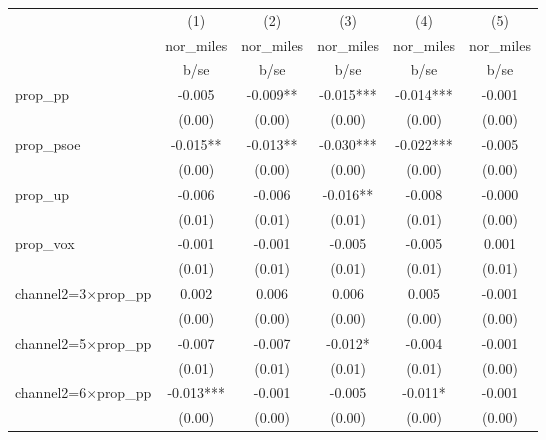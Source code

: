 \begin{tabular}{l*{5}{c}}
\toprule
                    &\multicolumn{1}{c}{(1)}&\multicolumn{1}{c}{(2)}&\multicolumn{1}{c}{(3)}&\multicolumn{1}{c}{(4)}&\multicolumn{1}{c}{(5)}\\
                    &\multicolumn{1}{c}{nor\_miles}&\multicolumn{1}{c}{nor\_miles}&\multicolumn{1}{c}{nor\_miles}&\multicolumn{1}{c}{nor\_miles}&\multicolumn{1}{c}{nor\_miles}\\
                    &        b/se   &        b/se   &        b/se   &        b/se   &        b/se   \\
\midrule
prop\_pp             &      -0.005   &      -0.009** &      -0.015***&      -0.014***&      -0.001   \\
                    &      (0.00)   &      (0.00)   &      (0.00)   &      (0.00)   &      (0.00)   \\
prop\_psoe           &      -0.015** &      -0.013** &      -0.030***&      -0.022***&      -0.005   \\
                    &      (0.00)   &      (0.00)   &      (0.00)   &      (0.00)   &      (0.00)   \\
prop\_up             &      -0.006   &      -0.006   &      -0.016** &      -0.008   &      -0.000   \\
                    &      (0.01)   &      (0.01)   &      (0.01)   &      (0.01)   &      (0.00)   \\
prop\_vox            &      -0.001   &      -0.001   &      -0.005   &      -0.005   &       0.001   \\
                    &      (0.01)   &      (0.01)   &      (0.01)   &      (0.01)   &      (0.01)   \\
channel2=3$\times$prop\_pp&       0.002   &       0.006   &       0.006   &       0.005   &      -0.001   \\
                    &      (0.00)   &      (0.00)   &      (0.00)   &      (0.00)   &      (0.00)   \\
channel2=5$\times$prop\_pp&      -0.007   &      -0.007   &      -0.012*  &      -0.004   &      -0.001   \\
                    &      (0.01)   &      (0.01)   &      (0.01)   &      (0.01)   &      (0.00)   \\
channel2=6$\times$prop\_pp&      -0.013***&      -0.001   &      -0.005   &      -0.011*  &      -0.001   \\
                    &      (0.00)   &      (0.00)   &      (0.00)   &      (0.00)   &      (0.00)   \\

\end{tabular}
